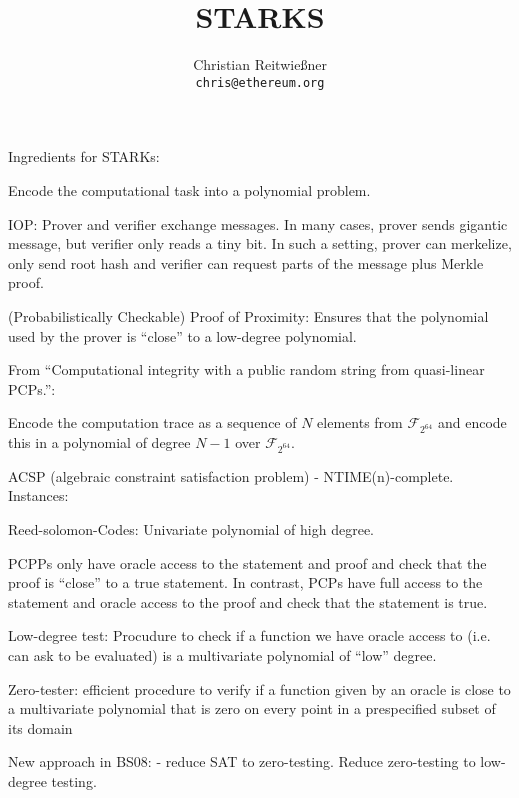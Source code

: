 \documentclass[11pt,letterpaper]{article}
\date{}
\begin{document}


\title{STARKS}

\author{Christian Reitwießner \\ 
{\tt chris@ethereum.org}}


\maketitle



Ingredients for STARKs:

Encode the computational task into a polynomial problem.

IOP: Prover and verifier exchange messages. In many cases, prover sends gigantic message, but verifier only reads a tiny bit.
In such a setting, prover can merkelize, only send root hash and verifier can request parts of the message plus Merkle proof.

(Probabilistically Checkable) Proof of Proximity: Ensures that the polynomial used by the prover is ``close'' to a low-degree polynomial.

From ``Computational integrity with a public random string from
quasi-linear PCPs.'':

Encode the computation trace as a sequence of $N$ elements from $\mathcal{F}_{2^64}$ and encode this in a polynomial of
degree $N-1$ over $\mathcal{F}_{2^64}$.

ACSP (algebraic constraint satisfaction problem) - NTIME(n)-complete.
  Instances: 



Reed-solomon-Codes: Univariate polynomial of high degree.

PCPPs only have oracle access to the statement and proof and check that the proof is ``close'' to a true statement.
In contrast, PCPs have full access to the statement and oracle access to the proof and check that the statement is true.

Low-degree test: Procudure to check if a function we have oracle access to (i.e. can ask to be evaluated) is a multivariate polynomial of ``low'' degree.

Zero-tester: efficient procedure to verify if a function given by an oracle is close to a multivariate polynomial that is
zero on every point in a prespecified subset of its domain

New approach in BS08:
 - reduce SAT to zero-testing. Reduce zero-testing to low-degree testing.
\end{document}
